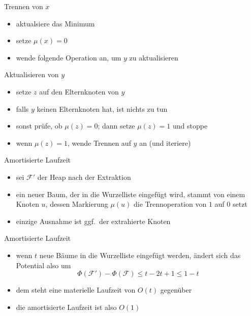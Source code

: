 \documentclass[aspectratio=1610, 11pt]{beamer}
\newcommand\cF{\mathcal F}
\begin{document}
\begin{frame}
\begin{overprint}
\begin{exampleblock}{Trennen von $x$}
\begin{itemize}
				\item aktualsiere das Minimum
				\item setze $\mu(x)=0$
				\item wende folgende Operation an, um $y$ zu aktualisieren 
			\end{itemize}
		\end{exampleblock}	
		\begin{exampleblock}{Aktualisieren von $y$}
			\begin{itemize}
				\item setze $z$ auf den Elternknoten von $y$
				\item falls $y$ keinen Elternknoten hat, ist nichts zu tun
				\item sonst pr\"ufe, ob $\mu(z)=0$; dann setze $\mu(z)=1$ und stoppe
				\item wenn $\mu(z)=1$, wende Trennen auf $y$ an (und iteriere)
			\end{itemize}
		\end{exampleblock}	
		\begin{exampleblock}{Amortisierte Laufzeit}
			\begin{itemize}
				\item sei $\cF'$ der Heap nach der Extraktion
				\item ein neuer Baum, der in die Wurzelliste eingef\"ugt wird, stammt von einem Knoten $u$, dessen Markierung $\mu(u)$ die Trennoperation von $1$ auf $0$ setzt
				\item einzige Ausnahme ist ggf.\ der extrahierte Knoten
			\end{itemize}
		\end{exampleblock}	
		\begin{exampleblock}{Amortisierte Laufzeit}
			\begin{itemize}
				\item wenn $t$ neue B\"aume in die Wurzelliste eingef\"ugt werden, \"andert sich das Potential also um
					$$\Phi(\cF')-\Phi(\cF)\leq t-2t+1\leq 1-t$$
				\item dem steht eine materielle Laufzeit von $O(t)$ gegen\"uber
				\item die amortisierte Laufzeit ist also $O(1)$
			\end{itemize}
		\end{exampleblock}	
	\end{overprint}
\end{frame}
\end{document}
